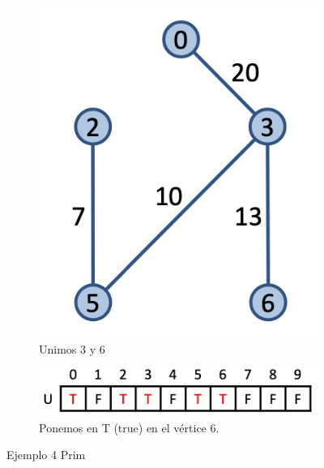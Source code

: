 \begin{figure}[h]
  \begin{minipage}{0.4\textwidth}
    \centering
    \begin{subfigure}{\textwidth}
      \centering
      \includegraphics[width=.5\textwidth]{assets/prim11.png}
      \caption{Unimos 3 y 6}
    \end{subfigure}
  \end{minipage}
  \hfill
  \begin{minipage}{0.5\textwidth}
    \centering
    \begin{subfigure}{\textwidth}
      \centering
      \includegraphics[width=.8\textwidth]{assets/prim12.png}
      \caption{Ponemos en T (true) en el vértice 6.}
    \end{subfigure}
  \end{minipage}
  \caption{Ejemplo 4 Prim}
\end{figure}


